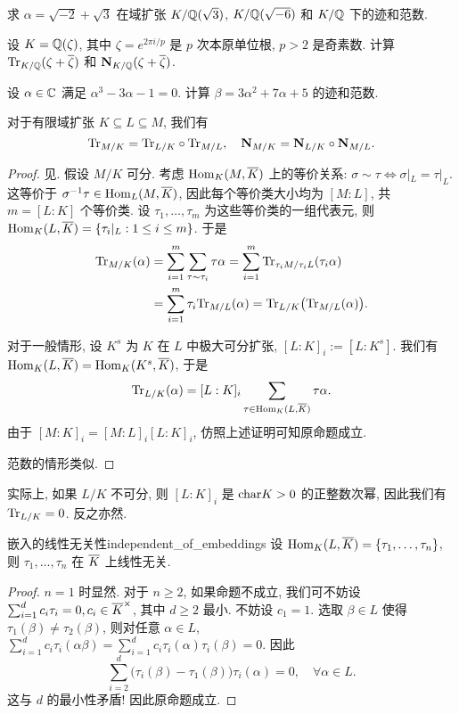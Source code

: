 \begin{exercise}
求 $\alpha=\sqrt{-2}+\sqrt3$ 在域扩张 $K/{\mathbb{Q}}(\sqrt3)$,  $K/{\mathbb{Q}}(\sqrt{-6})$ 和 $K/{\mathbb{Q}}$ 下的迹和范数.
\end{exercise}

\begin{exercise}
设 $K={\mathbb{Q}}(\zeta)$, 其中 $\zeta=e^{2\pi i/p}$ 是 $p$ 次本原单位根, $p>2$ 是奇素数. 计算 ${\mathrm{Tr}}_{K/{\mathbb{Q}}}(\zeta+\overline\zeta)$ 和 ${\mathbf{N}}_{K/{\mathbb{Q}}}(\zeta+\overline\zeta)$.
\end{exercise}

\begin{exercise}
设 $\alpha\in{\mathbb{C}}$ 满足 $\alpha^3-3\alpha-1=0$. 计算 $\beta=3\alpha^2+7\alpha+5$ 的迹和范数.
\end{exercise}

\begin{corollary}{}{}
对于有限域扩张 $K\subseteq L\subseteq M$, 我们有
  \[{\mathrm{Tr}}_{M/K}={\mathrm{Tr}}_{L/K}\circ {\mathrm{Tr}}_{M/L},\quad {\mathbf{N}}_{M/K}={\mathbf{N}}_{L/K}\circ {\mathbf{N}}_{M/L}.\]
\end{corollary}
\begin{proof}
见\cite[Chapter II, \S 10]{ZariskiSamuel1958}.
假设 $M/K$ 可分. 考虑 ${\mathrm{Hom}}_K(M,\overline K)$ 上的等价关系: $\sigma\sim\tau\iff \sigma|_L=\tau|_L$. 这等价于 $\sigma^{-1}\tau\in{\mathrm{Hom}}_L(M,\overline K)$, 因此每个等价类大小均为 $[M:L]$, 共 $m=[L:K]$ 个等价类. 设 $\tau_1,\dots,\tau_m$ 为这些等价类的一组代表元, 则 ${\mathrm{Hom}}_K(L,\overline K)=\left\{\tau_i|_L:1\le i\le m\right\}$. 于是
  \[\begin{split}
    {\mathrm{Tr}}_{M/K}(\alpha)&=\sum_{i=1}^m\sum_{\tau\sim\tau_i} \tau\alpha
      =\sum_{i=1}^m{\mathrm{Tr}}_{\tau_i M/\tau_i L}(\tau_i \alpha)\\
    &=\sum_{i=1}^m\tau_i{\mathrm{Tr}}_{M/L}(\alpha)
      ={\mathrm{Tr}}_{L/K}\bigl({\mathrm{Tr}}_{M/L}(\alpha)\bigr).
  \end{split}\]

对于一般情形, 设 $K^s$ 为 $K$ 在 $L$ 中极大可分扩张, $[L:K]_i:=[L:K^s]$. 我们有 ${\mathrm{Hom}}_{K}(L,\overline K)={\mathrm{Hom}}_K(K^s,\overline K)$, 于是
	\[{\mathrm{Tr}}_{L/K}(\alpha)=[L:K]_i\sum_{\tau\in{\mathrm{Hom}}_K(L,\overline K)}\tau\alpha.\]
由于 $[M:K]_i=[M:L]_i[L:K]_i$, 仿照上述证明可知原命题成立.

范数的情形类似.
\end{proof}
\begin{remark}
实际上, 如果 $L/K$ 不可分, 则 $[L:K]_i$ 是 ${\mathrm{char}} K>0$ 的正整数次幂, 因此我们有 ${\mathrm{Tr}}_{L/K}=0$.
反之亦然.
\end{remark}

\begin{proposition}{嵌入的线性无关性}{independent_of_embeddings}
设 ${\mathrm{Hom}}_K(L,\overline K)=\left\{\tau_1,\dots,\tau_n\right\}$, 则 $\tau_1,\dots,\tau_n$ 在 $\overline K$ 上线性无关.
\end{proposition}
\begin{proof}
$n=1$ 时显然. 对于 $n\ge2$, 如果命题不成立, 我们可不妨设 $\sum_{i=1}^d c_i\tau_i=0,c_i\in\overline K^\times$, 其中 $d\ge 2$ 最小. 不妨设 $c_1=1$. 选取 $\beta\in L$ 使得 $\tau_1(\beta)\neq\tau_2(\beta)$, 则对任意 $\alpha\in L$, $\sum_{i=1}^d c_i\tau_i(\alpha\beta)=\sum_{i=1}^d c_i\tau_i(\alpha)\tau_i(\beta)=0$. 因此
	\[\sum_{i=2}^d\bigl(\tau_i(\beta)-\tau_1(\beta)\bigr)\tau_i(\alpha)=0,\quad\forall \alpha\in L.\]
这与 $d$ 的最小性矛盾! 因此原命题成立.
\end{proof}


